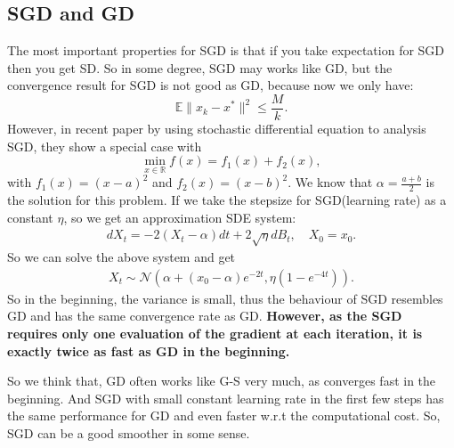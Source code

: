 \subsection{SGD and GD}
The most important properties for SGD is that if you take expectation for SGD then you get SD. So in some degree, SGD may works like GD, but the convergence result for SGD is not good as GD, because now we only have:
\begin{equation}
\mathbb{E}\|x_k - x^*\|^2 \le \frac{M}{k}.
\end{equation}
However, in recent paper by using stochastic differential equation to analysis SGD, they show a special case with 
\begin{equation}
\min_{x \in \mathbb{R}} f(x) = f_1(x) + f_2(x),
\end{equation}
with $f_1(x) = (x - a)^2$ and $f_2(x) = (x - b)^2$. We know that $\alpha = \frac{a+b}{2}$ is the solution for this problem. If we take the stepsize for SGD(learning rate) as a constant $\eta$, so we get an approximation SDE system:
\begin{align}
d X_t = -2(X_t - \alpha )dt + 2\sqrt{\eta}dB_t, \quad X_0 = x_0.
\end{align}
So we can solve the above system and get 
\begin{align}
X_t \sim \mathcal{N}(\alpha + (x_0 - \alpha)e^{-2t}, \eta(1 - e^{-4t})).
\end{align}
So in the beginning, the variance is small, thus the behaviour of SGD resembles GD and has the same convergence rate as GD. {\bf However, as the SGD requires only one evaluation of the gradient at each iteration, it is exactly twice as fast as GD in the beginning.}

So we think that, GD often works like G-S very much, as converges fast in the beginning. And SGD with small constant learning rate in the first few steps has the same performance for GD and even faster w.r.t the computational cost. So, SGD can be a good smoother in some sense. 